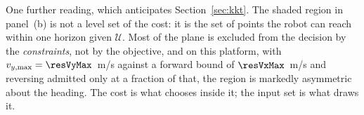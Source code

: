 \documentclass[11pt,a4paper]{article}
\newcommand{\R}{\mathbb{R}}
\begin{document}
One further reading, which anticipates Section~\ref{sec:kkt}. The shaded region in panel~(b) is not a level
set of the cost: it is the set of points the robot can reach within one horizon given $\mathcal{U}$. Most of
the plane is excluded from the decision by the \emph{constraints}, not by the objective, and on this
platform, with $v_{y,\max}=\resVyMax$~m/s against a forward bound of $\resVxMax$~m/s and reversing
admitted only at a fraction of that, the region is markedly asymmetric about
the heading. The cost is what chooses inside it; the input set is what draws it.


\end{document}
